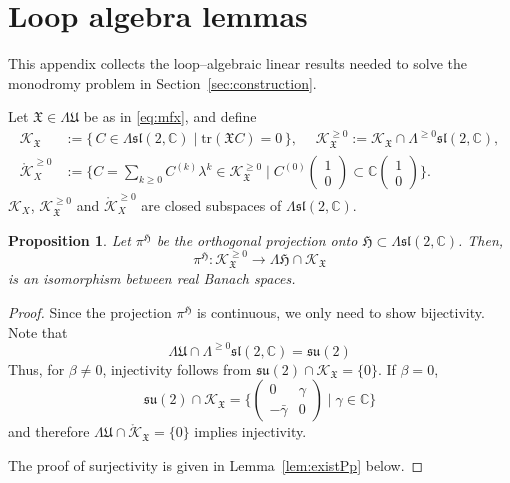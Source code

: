\documentclass[12pt,a4paper]{amsart}
\newtheorem{proposition}[theorem]{Proposition}
\theoremstyle{definition}
\theoremstyle{remark}
\newcommand{\C}{\mathbb C}
\newcommand{\tr}{\mathrm{tr}}
\begin{document}
\appendix
\section{Loop algebra lemmas}\label{appendix}
This appendix collects the loop--algebraic linear results needed to solve the
monodromy problem in Section~\ref{sec:construction}.


Let $\mathfrak X\in\Lambda\mathfrak U$ be as in \eqref{eq:mfx}, and define
\begin{equation*}
\begin{split}
\mathcal K_{\mathfrak X}&
:=
\{\,C\in \Lambda\mathfrak{sl}(2,\C)\mid \tr(\mathfrak XC)=0\,\},\;\quad
\mathcal K^{\geq0}_{\mathfrak X}
:=
\mathcal K_{\mathfrak X}\cap\Lambda^{\geq0}\mathfrak{sl}(2,\C),\\
\mathring{\mathcal K}^{\geq0}_X&:=\{ C=\sum_{k\geq0}C^{(k)}\lambda^k\in\mathcal K^{\geq0}_{\mathfrak X}\mid
C^{(0)}\begin{pmatrix}1\\0\end{pmatrix}\subset \C \begin{pmatrix}1\\0\end{pmatrix}\}.
\end{split}
\end{equation*}
$\mathcal K_X$, $\mathcal K^{\geq0}_{\mathfrak X}$ and $\mathring{\mathcal K}^{\geq0}_X$ are closed subspaces of $\Lambda\mathfrak{sl}(2,\C)$.


\begin{proposition}\label{prop:solutionatpj}
Let  $\pi^\mathfrak H$ be the orthogonal projection onto $\mathfrak H\subset \Lambda\mathfrak{sl}(2,\C)$.
Then,
\[\pi^\mathfrak H\colon \mathcal K^{\geq0}_{\mathfrak X}\to \Lambda\mathfrak H\cap \mathcal K_{\mathfrak X}\]
is an  isomorphism between real Banach spaces.
\end{proposition}
\begin{proof}
Since the projection $\pi^\mathfrak H$ is continuous, we only need to show bijectivity.
Note that
\[
\Lambda\mathfrak U\cap \Lambda^{\geq0}\mathfrak{sl}(2,\C)=\mathfrak{su}(2)
\]
Thus, for $\beta\neq0$, injectivity follows from
$
\mathfrak{su}(2)\cap \mathcal K_{\mathfrak X}=\{0\}.
$
If $\beta=0$, 
\[\mathfrak{su}(2)\cap \mathcal K_{\mathfrak X}=\{\begin{pmatrix}0&\gamma\\-\bar\gamma& 0\end{pmatrix}\mid \gamma\in\C\}\]
and therefore
$\Lambda\mathfrak U\cap \mathring{\mathcal K}_{\mathfrak X}=\{0\}$ implies injectivity.

The proof of surjectivity is given in 
Lemma~\ref{lem:existPp} 
 below.
\end{proof}
\end{document}
